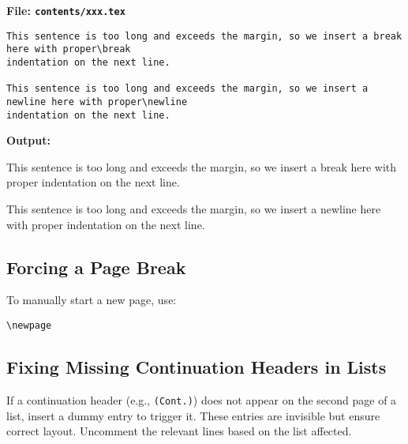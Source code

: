 \documentclass{VISTEC}
\begin{document}
\noindent\textbf{File: \texttt{contents/xxx.tex}}\vspace{-1.5em}
\begin{verbatim}
This sentence is too long and exceeds the margin, so we insert a break here with proper\break
indentation on the next line.

This sentence is too long and exceeds the margin, so we insert a newline here with proper\newline
indentation on the next line.
\end{verbatim}

\textbf{Output:}\vspace{0.5em}

\begin{tcolorbox}[colback=white, colframe=black, sharp corners, boxrule=0.4pt]
This sentence is too long and exceeds the margin, so we insert a break here with proper\break
indentation on the next line.

This sentence is too long and exceeds the margin, so we insert a newline here with proper\newline
indentation on the next line.
\end{tcolorbox}

\subsection{Forcing a Page Break}

\begin{subparagraph}
To manually start a new page, use:
\end{subparagraph}

\begin{verbatim}
\newpage
\end{verbatim}

\subsection{Fixing Missing Continuation Headers in Lists}


\begin{subparagraph}
If a continuation header (e.g., \texttt{(Cont.)}) does not appear on the second page of a list, insert a dummy entry to trigger it. These entries are invisible but ensure correct layout. Uncomment the relevant lines based on the list affected.
\end{subparagraph}
\end{document}
